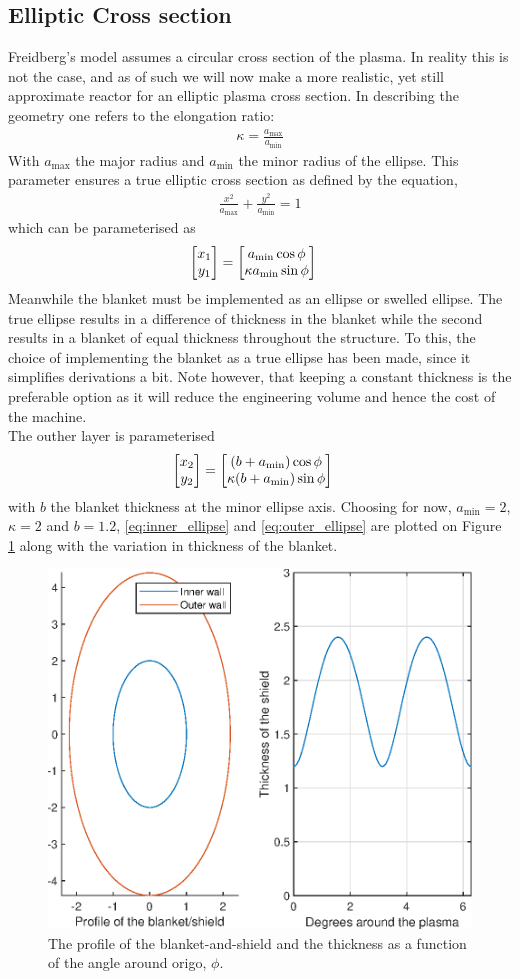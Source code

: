 \subsection{Elliptic Cross section}
Freidberg's model assumes a circular cross section of the plasma. In reality this is not the case, and as of such we will now make a more realistic, yet still approximate reactor for an elliptic plasma cross section.
In describing the geometry one refers to the elongation ratio:
\begin{align}
	\kappa = \frac{a_{\max}}{a_{\min}}
\end{align}
With $a_{\max}$ the major radius and $a_{\min}$ the minor radius of the ellipse. This parameter ensures a true elliptic cross section as defined by the equation,
\begin{align}
	\frac{x^2}{a_{\max}}+\frac{y^2}{a_{\min}} = 1
\end{align}
which can be parameterised as
\begin{align}
	\mqty[x_1 \\y_1] &= \mqty[a_{\min}\cos{\phi}\\\kappa a_{\min}\sin{\phi}]
	\label{eq:inner_ellipse}
\end{align}
Meanwhile the blanket must be implemented as an ellipse or swelled ellipse. The true ellipse results in a difference of thickness in the blanket while the second results in a blanket of equal thickness throughout the structure. To this, the choice of implementing the blanket as a true ellipse has been made, since it simplifies derivations a bit. Note however, that keeping a constant thickness is the preferable option as it will reduce the engineering volume and hence the cost of the machine.\\
The outher layer is parameterised
\begin{align}
	\mqty[x_2 \\y_2] &= \mqty[\pqty{b+a_{\min}}\cos{\phi}\\\kappa \pqty{b+a_{\min}}\sin{\phi}]
	\label{eq:outer_ellipse}
\end{align}
with $b$ the blanket thickness at the minor ellipse axis. Choosing for now, $a_{\min}=2$, $\kappa=2$ and $b=1.2$, \ref{eq:inner_ellipse} and \ref{eq:outer_ellipse} are plotted on Figure \ref{ShTh} along with the variation in thickness of the blanket.
\begin{figure}
	\vspace{-5mm}
	\includegraphics[width=.4\textwidth]{MatlabFigures/ShieldThickness/ShieldThickness.eps}
	\caption{The profile of the blanket-and-shield and the thickness as a function of the angle around origo, \(\phi\).}
	\label{ShTh}
\end{figure}
